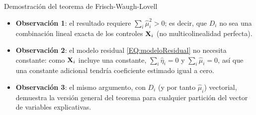 \documentclass[9pt, xcolor=dvipsnames]{beamer}
\begin{document}
\begin{frame}{Demostración del teorema de Frisch-Waugh-Lovell}
\begin{itemize}
    \item \textbf{Observación 1}: el resultado requiere \(\sum_i \hat{\mu}^2_i > 0\); es decir, que \(D_i\) no sea una combinación lineal exacta de los controles \(\textbf{X}_i\) (no multicolinealidad perfecta).
    \vspace{0.5em}
    \item \textbf{Observación 2}: el modelo residual \eqref{EQ:modeloResidual} no necesita constante: como \(\textbf{X}_i\) incluye una constante, \(\sum_i \hat{\eta}_i = 0\) y \(\sum_i \hat{\mu}_i = 0\), así que una constante adicional tendría coeficiente estimado igual a cero.
    \vspace{0.5em}
    \item \textbf{Observación 3}: el mismo argumento, con \(D_i\) (y por tanto \(\hat{\mu}_i\)) vectorial, demuestra la versión general del teorema para cualquier partición del vector de variables explicativas.
\end{itemize}
\vspace{0.5em}
\hyperlink{DIAP:FWL}{{}}
\end{frame}

\end{document}
